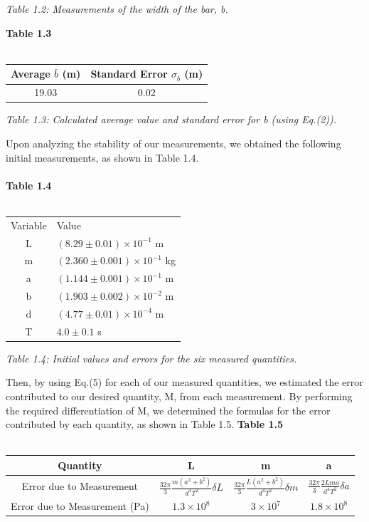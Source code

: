 \documentclass[leqno]{article}
\begin{document}
\begin{flushleft}
\textit{\small Table 1.2: Measurements of the width of the bar, b.}
\end{flushleft}
\textbf{Table 1.3}\\\\
\begin{tabular}{|c|c|}
	\hline
	Average $\bar{b}$ (m) & Standard Error $\sigma_{\bar{b}}$ (m)\\
	\hline
	19.03 & 0.02\\
	\hline
\end{tabular}
\begin{flushleft}
\textit{\small Table 1.3: Calculated average value and standard error for b (using Eq.(2)).}
\end{flushleft}
Upon analyzing the stability of our measurements, we obtained the following initial measurements, as shown in Table 1.4.\\\\
\textbf{Table 1.4}\\\\
\begin{tabular}{c|l}
Variable & Value\\
L & $(8.29\pm0.01)\times10^{-1}$ m\\
m & $(2.360\pm0.001)\times 10^{-1}$ kg\\
a & $(1.144\pm0.001)\times10^{-1}$ m\\
b & $(1.903\pm0.002)\times10^{-2}$ m\\
d & $(4.77\pm0.01)\times10^{-4}$ m\\
T & $4.0 \pm 0.1$ s\\
\end{tabular}
\begin{flushleft}
\textit{\small Table 1.4: Initial values and errors for the six measured quantities.}
\end{flushleft}
Then, by using Eq.(5) for each of our measured quantities, we estimated the error contributed to our desired quantity, M, from each measurement.
By performing the required differentiation of M, we determined the formulas for the error contributed by each quantity, as shown in Table 1.5.\newpage
\textbf{Table 1.5}\\\\
\begin{tabular}{|c|c|c|c|}
	\hline
	Quantity & L & m & a\\
	\hline
	Error due to Measurement& $\frac{32\pi}{3}\frac{m(a^2+b^2)}{d^4 T^2}\delta L$ & $\frac{32\pi}{3}\frac{L(a^2+b^2)}{d^4 T^2}\delta m$ & $\frac{32\pi}{3}\frac{2Lma}{d^4 T^2}\delta a$  \\
\hline
Error due to Measurement (Pa)& $1.3\times10^8$ & $3\times10^7$ & $1.8\times10^8$\\
\hline
\end{tabular}\\\\\\
\end{document}

